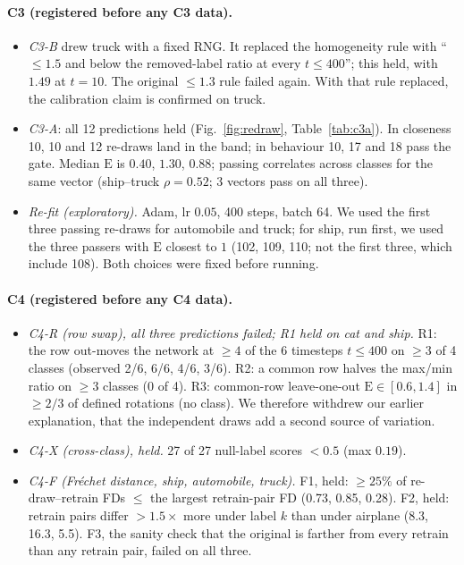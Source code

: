\documentclass[10pt]{article}
\newcommand{\E}{\mathrm{E}}
\begin{document}
\paragraph{C3 (registered before any C3 data).}
\begin{itemize}
\item \emph{C3-B} drew truck with a fixed RNG. It replaced the homogeneity rule with ``$\le1.5$ and below the removed-label ratio at every $t\le400$''; this held, with $1.49$ at $t=10$. The original $\le1.3$ rule failed again. With that rule replaced, the calibration claim is confirmed on truck.
\item \emph{C3-A}: all 12 predictions held (Fig.~\ref{fig:redraw}, Table~\ref{tab:c3a}). In closeness 10, 10 and 12 re-draws land in the band; in behaviour 10, 17 and 18 pass the gate. Median $\E$ is $0.40$, $1.30$, $0.88$; passing correlates across classes for the same vector (ship--truck $\rho=0.52$; 3 vectors pass on all three).
\item \emph{Re-fit (exploratory).} Adam, lr $0.05$, 400 steps, batch 64. We used the first three passing re-draws for automobile and truck; for ship, run first, we used the three passers with $\E$ closest to $1$ (102, 109, 110; not the first three, which include 108). Both choices were fixed before running.
\end{itemize}

\paragraph{C4 (registered before any C4 data).}
\begin{itemize}
\item \emph{C4-R (row swap), all three predictions failed; R1 held on cat and ship.} R1: the row out-moves the network at $\ge4$ of the 6 timesteps $t\le400$ on $\ge3$ of 4 classes (observed 2/6, 6/6, 4/6, 3/6). R2: a common row halves the max/min ratio on $\ge3$ classes (0 of 4). R3: common-row leave-one-out $\E\in[0.6,1.4]$ in $\ge2/3$ of defined rotations (no class). We therefore withdrew our earlier explanation, that the independent draws add a second source of variation.
\item \emph{C4-X (cross-class), held.} 27 of 27 null-label scores $<0.5$ (max $0.19$).
\item \emph{C4-F (Fréchet distance, ship, automobile, truck).} F1, held: $\ge25\%$ of re-draw--retrain FDs $\le$ the largest retrain-pair FD (0.73, 0.85, 0.28). F2, held: retrain pairs differ $>1.5\times$ more under label $k$ than under airplane (8.3, 16.3, 5.5). F3, the sanity check that the original is farther from every retrain than any retrain pair, failed on all three.
\end{itemize}
\end{document}
